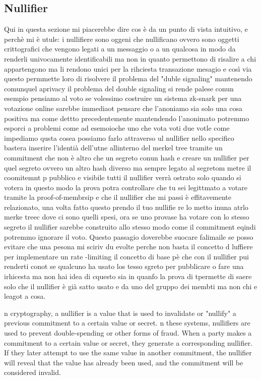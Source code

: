 \subsection{Nullifier}
Qui in questa sezione mi piacerebbe dire cos è da un punto di vista intuitivo, e perchè mi è utule: i nullifiere sono
oggeni che nullificano ovvero sono oggetti crittografici che vengono legati a un messaggio o a un qualcosa in modo da
renderli univocamente identificabili ma non in quanto permettono di risalire a chi appartengono ma li rendono unici per
la rihciesta transazione mesagio e così via questo permmette loro di risolvere il problema del "duble signaling"
mantenendo comunquel aprivacy il problema del double signaling si rende palese conun esempio pensiamo al voto se
volessimo costruire un sistema zk-snark per una votazione online sarebbe immediaot pensare che l'anoniamo sia solo una
cosa positiva ma come dettto precedentemente mantendendo l'anonimato potremmo esporci a problemi come ad esemoioche uno
che vota voti due votle come impediamo qusta cosea possiamo farlo attraverso ul nullifier nello specifico bastera
inserire l'identià dell'utne allinterno del merkel tree tramite un commitment che non è altro che un segreto conun hash
e creare un nullifier per quel segreto ovvero un altro hash diverso ma sempre legato al segretom metre il coomitemnt p
pubblico e visibile  tutti il nullifier verrà ostrato solo quando si votera in questo modo la prova potra controllare
che tu sei legittmato a votare tramite la proof-of-membrsip e che il nullifier che mi passi è effitavemente relazionato,
una volta fatto questo prendo il tuo nullifie re lo metto inuna atrlo merke treec dove ci sono quelli spesi, ora se uno
provase ha votare con lo stesso segreto il nullifier sarebbe construito allo stesso modo come il commitment eqindi
potremmo ignorare il voto. Questo passagio doverebbe suocare falimaile se posso evitare che una pesona mi sciriv du
evolte perche non basta il concetto d luffiere per implementare un rate -limiting il concetto di base pè che con il
nullifier pui renderti conot se qualcuno ha usato los tesso sgreto per pubblicare o fare una irhicesta ma non hai idea
di cquesto sia in quanfo la prova di tpermette di saere solo che il nullifier è già satto usato e da uno del gruppo dei
membti ma non chi e leagot a cosa.


n cryptography, a nullifier is a value that is used to invalidate or "nullify" a previous commitment to a certain value
or secret. n these systems, nullifiers are used to prevent double-spending or other forms of fraud. When a party makes a
commitment to a certain value or secret, they generate a corresponding nullifier. If they later attempt to use the same
value in another commitment, the nullifier will reveal that the value has already been used, and the commitment will be
considered invalid.

